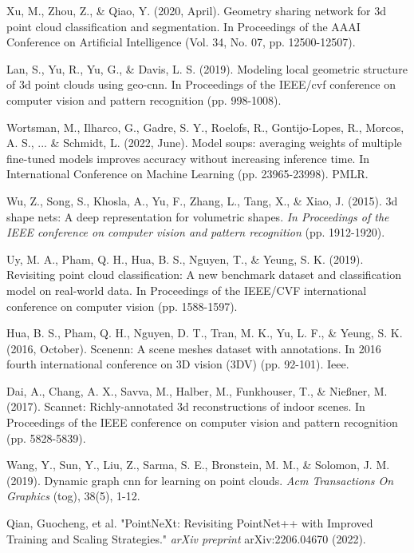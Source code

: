 \documentclass[runningheads]{llncs}
\begin{document}
\begin{thebibliography}{18}
Xu, M., Zhou, Z., \& Qiao, Y. (2020, April). Geometry sharing network for 3d point cloud classification and segmentation. In Proceedings of the AAAI Conference on Artificial Intelligence (Vol. 34, No. 07, pp. 12500-12507).

Lan, S., Yu, R., Yu, G., \& Davis, L. S. (2019). Modeling local geometric structure of 3d point clouds using geo-cnn. In Proceedings of the IEEE/cvf conference on computer vision and pattern recognition (pp. 998-1008).

Wortsman, M., Ilharco, G., Gadre, S. Y., Roelofs, R., Gontijo-Lopes, R., Morcos, A. S., ... \& Schmidt, L. (2022, June). Model soups: averaging weights of multiple fine-tuned models improves accuracy without increasing inference time. In International Conference on Machine Learning (pp. 23965-23998). PMLR.

Wu, Z., Song, S., Khosla, A., Yu, F., Zhang, L., Tang, X., \& Xiao, J. (2015). 3d shape nets: A deep representation for volumetric shapes. \textit{In Proceedings of the IEEE conference on computer vision and pattern recognition} (pp. 1912-1920).

Uy, M. A., Pham, Q. H., Hua, B. S., Nguyen, T., \& Yeung, S. K. (2019). Revisiting point cloud classification: A new benchmark dataset and classification model on real-world data. In Proceedings of the IEEE/CVF international conference on computer vision (pp. 1588-1597).

Hua, B. S., Pham, Q. H., Nguyen, D. T., Tran, M. K., Yu, L. F., \& Yeung, S. K. (2016, October). Scenenn: A scene meshes dataset with annotations. In 2016 fourth international conference on 3D vision (3DV) (pp. 92-101). Ieee.

Dai, A., Chang, A. X., Savva, M., Halber, M., Funkhouser, T., \& Nießner, M. (2017). Scannet: Richly-annotated 3d reconstructions of indoor scenes. In Proceedings of the IEEE conference on computer vision and pattern recognition (pp. 5828-5839).

Wang, Y., Sun, Y., Liu, Z., Sarma, S. E., Bronstein, M. M., \& Solomon, J. M. (2019). Dynamic graph cnn for learning on point clouds. \textit{Acm Transactions On Graphics} (tog), 38(5), 1-12.





 Qian, Guocheng, et al. "PointNeXt: Revisiting PointNet++ with Improved Training and Scaling Strategies." \textit{arXiv preprint} arXiv:2206.04670 (2022).


\end{thebibliography}
\end{document}
